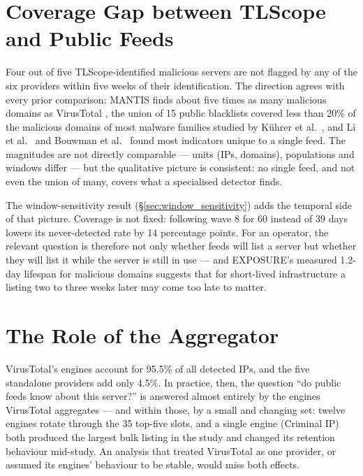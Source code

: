 \section{Coverage Gap between TLScope and Public Feeds}

Four out of five TLScope-identified malicious servers are not flagged by any of the six providers
within five weeks of their identification. The direction agrees with every prior comparison: MANTIS
finds about five times as many malicious domains as VirusTotal \cite{deniz2025mantis}, the union of
15 public blacklists covered less than 20\% of the malicious domains of most malware families
studied by Kührer et al.\ \cite{kuhrer2014paintitblack}, and Li et al.\ \cite{li2019teaLeaves} and
Bouwman et al.\ \cite{bouwman2020differentcup} found most indicators unique to a single feed. The
magnitudes are not directly comparable --- units (IPs, domains), populations and windows differ ---
but the qualitative picture is consistent: no single feed, and not even the union of many, covers
what a specialised detector finds.

The window-sensitivity result (\S\ref{sec:window_sensitivity}) adds the temporal side of that
picture. Coverage is not fixed: following wave 8 for 60 instead of 39 days lowers its never-detected
rate by 14 percentage points. For an operator, the relevant question is therefore not only whether
feeds will list a server but whether they will list it while the server is still in use --- and
EXPOSURE's measured 1.2-day lifespan for malicious domains \cite{bilge2011exposure} suggests that for
short-lived infrastructure a listing two to three weeks later may come too late to matter.

\section{The Role of the Aggregator}

VirusTotal's engines account for 95.5\% of all detected IPs, and the five standalone providers add
only 4.5\%. In practice, then, the question ``do public feeds know about this server?'' is answered
almost entirely by the engines VirusTotal aggregates --- and within those, by a small and changing
set: twelve engines rotate through the 35 top-five slots, and a single engine (Criminal IP) both
produced the largest bulk listing in the study and changed its retention behaviour mid-study. An
analysis that treated VirusTotal as one provider, or assumed its engines' behaviour to be stable,
would miss both effects.

